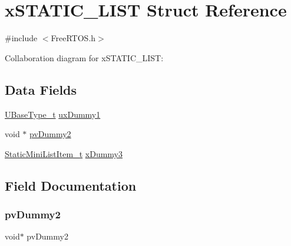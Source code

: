 \hypertarget{structx_s_t_a_t_i_c___l_i_s_t}{}\section{x\+S\+T\+A\+T\+I\+C\+\_\+\+L\+I\+ST Struct Reference}
\label{structx_s_t_a_t_i_c___l_i_s_t}


{\ttfamily \#include $<$Free\+R\+T\+O\+S.\+h$>$}



Collaboration diagram for x\+S\+T\+A\+T\+I\+C\+\_\+\+L\+I\+ST\+:
\subsection*{Data Fields}
\begin{DoxyCompactItemize}
\item 
\hyperlink{portmacro_8h_a646f89d4298e4f5afd522202b11cb2e6}{U\+Base\+Type\+\_\+t} \hyperlink{structx_s_t_a_t_i_c___l_i_s_t_a721a2d25ba03ddd0abfcf3d9336e8f12}{ux\+Dummy1}
\item 
void $\ast$ \hyperlink{structx_s_t_a_t_i_c___l_i_s_t_a44b3b17a1410a0bcec9b416f2bc89a96}{pv\+Dummy2}
\item 
\hyperlink{_free_r_t_o_s_8h_a9097f48f4dfa56e8e01d9179462c7994}{Static\+Mini\+List\+Item\+\_\+t} \hyperlink{structx_s_t_a_t_i_c___l_i_s_t_a22f81ad5d2e6efe9c850330af339ac02}{x\+Dummy3}
\end{DoxyCompactItemize}


\subsection{Field Documentation}
\mbox{\label{structx_s_t_a_t_i_c___l_i_s_t_a44b3b17a1410a0bcec9b416f2bc89a96}} 
\subsubsection{\texorpdfstring{pv\+Dummy2}{pvDummy2}}
{\footnotesize\ttfamily void$\ast$ pv\+Dummy2}

\mbox{\label{structx_s_t_a_t_i_c___l_i_s_t_a721a2d25ba03ddd0abfcf3d9336e8f12}} 
